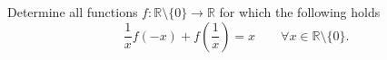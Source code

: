 Determine all functions $f\colon\mathbb{R}\setminus\{0\} \rightarrow\mathbb{R}$ for
which the following holds
$$\frac{1}{x}f(-x)+f\left(\frac{1}{x}\right)=x\qquad \forall x \in \mathbb{R}\setminus\{0\}.$$
